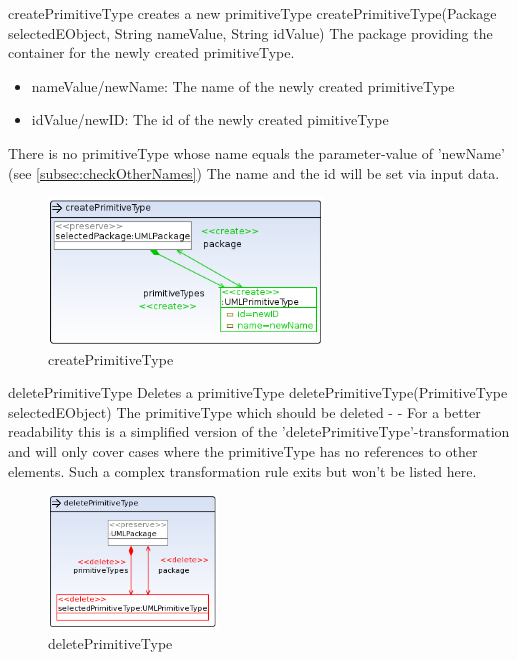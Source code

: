 \op
{createPrimitiveType}
{creates a new primitiveType}
{createPrimitiveType(Package selectedEObject, String nameValue, String idValue)}
{The package providing the container for the newly created primitiveType.}
{
\begin{itemize}
 \item nameValue/newName: The name of the newly created primitiveType
 \item idValue/newID: The id of the newly created pimitiveType
\end{itemize}
}
{There is no primitiveType whose name equals the parameter-value of 'newName' (see
\ref{subsec:checkOtherNames})}
{The name and the id will be set via input data.}
\begin{figure}[H]
  \centering
  \includegraphics[width=0.65\textwidth]{pics/createPrimitiveType.png}
  \caption{createPrimitiveType}
  \label{createPrimitiveType}
\end{figure}
\op
{deletePrimitiveType}
{Deletes a primitiveType}
{deletePrimitiveType(PrimitiveType selectedEObject)}
{The primitiveType which should be deleted}
{-}
{-}
{For a better readability this is a simplified version of the
'deletePrimitiveType'-transformation and will only cover cases where the
primitiveType has no references to other elements. Such a
complex transformation rule exits but won't be listed here.}
\begin{figure}[H]
  \centering
  \includegraphics[width=0.4\textwidth]{pics/deletePrimitiveType_emptyAndUnreferenced.png}
  \caption{deletePrimitiveType}
  \label{deletePrimitiveType}
\end{figure}
